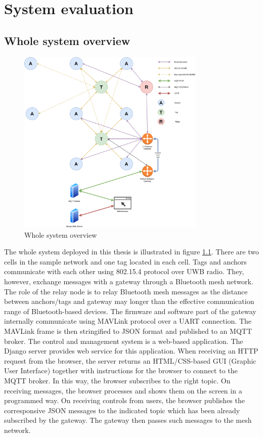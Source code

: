 \documentclass[\main/main.tex]{subfiles}
\begin{document}
\graphicspath{{img/}{06_result/img/}}

\chapter{System evaluation}

\section{Whole system overview}
\begin{figure}[H]
    \centering
    \includegraphics[width=0.8\textwidth]{system_overview.png}
    \caption{Whole system overview}
    \label{fig:system_overview}
\end{figure}
The whole system deployed in this thesis is illustrated in figure \ref{fig:system_overview}. There are two cells in the sample network and one tag located in each cell. Tags and anchors communicate with each other using 802.15.4 protocol over UWB radio. They, however, exchange messages with a gateway through a Bluetooth mesh network. The role of the relay node is to relay Bluetooth mesh messages as the distance between anchors/tags and gateway may longer than the effective communication range of Bluetooth-based devices. The firmware and software part of the gateway internally communicate using MAVLink protocol over a UART connection. The MAVLink frame is then stringified to JSON format and published to an MQTT broker. The control and management system is a web-based application. The Django server provides web service for this application. When receiving an HTTP request from the browser, the server returns an HTML/CSS-based GUI (Graphic User Interface) together with instructions for the browser to connect to the MQTT broker. In this way, the browser subscribes to the right topic. On receiving messages, the browser processes and shows them on the screen in a programmed way. On receiving controls from users, the browser publishes the corresponsive JSON messages to the indicated topic which has been already subscribed by the gateway. The gateway then passes such messages to the mesh network.
\end{document}
